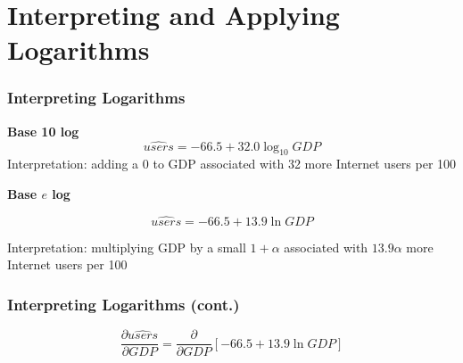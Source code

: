 \documentclass[12pt, block=fill]{beamer}
\begin{document}
\section{Interpreting and Applying Logarithms}

\begin{frame}
  \frametitle{Interpreting Logarithms}
   \textbf{Base 10 log}
  $$\widehat{users} = -66.5 + 32.0 \log_{10} GDP$$
  Interpretation: adding a 0 to GDP associated with 32 more Internet
  users per 100
  
  \textbf{Base $e$ log}
  
  $$\widehat{users} = -66.5 + 13.9 \ln GDP$$
  
  Interpretation: multiplying GDP by a small $1+\alpha$ associated with
  $13.9 \alpha$ more Internet users per 100
\end{frame}

\begin{frame}[t]
  \frametitle{Interpreting Logarithms (cont.)}
$$ \frac{\partial \widehat{users}}{\partial GDP} =
                                                    \frac{\partial}{\partial GDP} [ -66.5 + 13.9\ln GDP ] $$
  
\end{frame}
\end{document}
